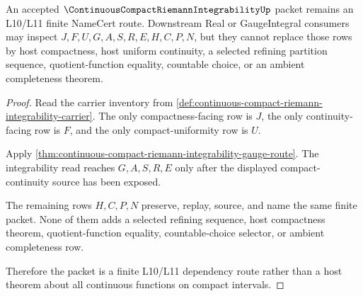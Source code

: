 \begin{theorem}
\label{thm:continuous-compact-riemann-integrability-l10-nonescape}
An accepted $\ContinuousCompactRiemannIntegrabilityUp$ packet remains an L10/L11 finite NameCert route. Downstream Real or GaugeIntegral consumers may inspect $J,F,U,G,A,S,R,E,H,C,P,N$, but they cannot replace those rows by host compactness, host uniform continuity, a selected refining partition sequence, quotient-function equality, countable choice, or an ambient completeness theorem.
\end{theorem}
\begin{proof}
Read the carrier inventory from \autoref{def:continuous-compact-riemann-integrability-carrier}. The only compactness-facing row is $J$, the only continuity-facing row is $F$, and the only compact-uniformity row is $U$.

Apply \autoref{thm:continuous-compact-riemann-integrability-gauge-route}. The integrability read reaches $G,A,S,R,E$ only after the displayed compact-continuity source has been exposed.

The remaining rows $H,C,P,N$ preserve, replay, source, and name the same finite packet. None of them adds a selected refining sequence, host compactness theorem, quotient-function equality, countable-choice selector, or ambient completeness row.

Therefore the packet is a finite L10/L11 dependency route rather than a host theorem about all continuous functions on compact intervals.
\end{proof}


